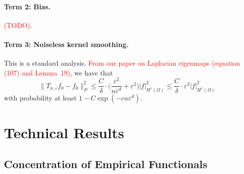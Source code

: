 \documentclass{article}
\newcommand{\1}{\mathbf{1}}
\theoremstyle{alden}
\theoremstyle{aldenthm}
\theoremstyle{definition}
\theoremstyle{remark}
\begin{document}
\paragraph{Term 2: Bias.}
\textcolor{red}{(TODO)}.

\paragraph{Term 3: Noiseless kernel smoothing.}
This is a standard analysis. \textcolor{red}{From our paper on Laplacian eigenmaps (equation (107) and Lemma~19)}, we have that
\begin{equation*}
\|T_{n,\varepsilon}f_0 - f_0\|_P^2 \leq \frac{C}{\delta} \cdot \biggl(\frac{\varepsilon^2}{n\varepsilon^d} + \varepsilon^2\biggr) |f|_{H^1(\Omega)}^2 \leq \frac{C}{\delta} \cdot \varepsilon^2 |f|_{H^1(\Omega)}^2
\end{equation*}
with probability at least $1 - C\exp(-cn\varepsilon^d)$. 

\section{Technical Results}

\subsection{Concentration of Empirical Functionals}
\end{document}
